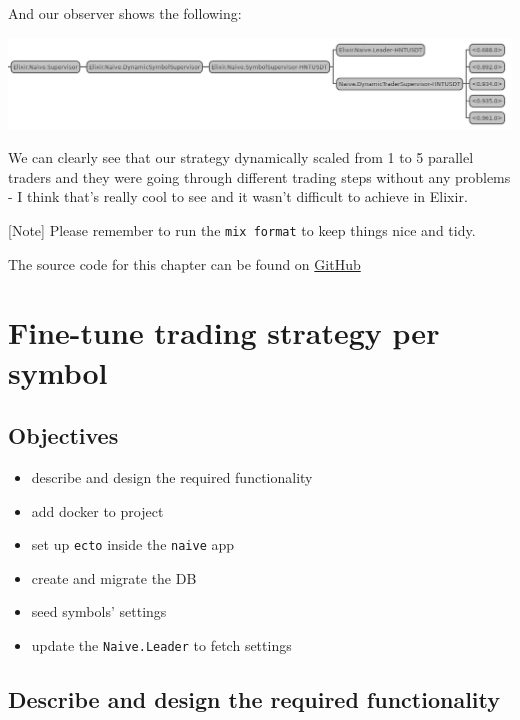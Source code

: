 \documentclass[
  oneside]{book}
\providecommand{\tightlist}{%
  \setlength{\itemsep}{0pt}\setlength{\parskip}{0pt}}
\begin{document}
And our observer shows the following:

\begin{center}\includegraphics[width=1\linewidth]{images/chapter_09_supervision_tree} \end{center}

We can clearly see that our strategy dynamically scaled from 1 to 5 parallel traders and they were going through different trading steps without any problems - I think that's really cool to see and it wasn't difficult to achieve in Elixir.

{[}Note{]} Please remember to run the \texttt{mix\ format} to keep things nice and tidy.

The source code for this chapter can be found on \href{https://github.com/Cinderella-Man/hands-on-elixir-and-otp-cryptocurrency-trading-bot-source-code/tree/chapter_09}{GitHub}

\chapter{Fine-tune trading strategy per symbol}\label{fine-tune-trading-strategy-per-symbol}

\section{Objectives}\label{objectives-9}

\begin{itemize}
\tightlist
\item
  describe and design the required functionality
\item
  add docker to project
\item
  set up \texttt{ecto} inside the \texttt{naive} app
\item
  create and migrate the DB
\item
  seed symbols' settings
\item
  update the \texttt{Naive.Leader} to fetch settings
\end{itemize}

\section{Describe and design the required functionality}\label{describe-and-design-the-required-functionality-1}
\end{document}
